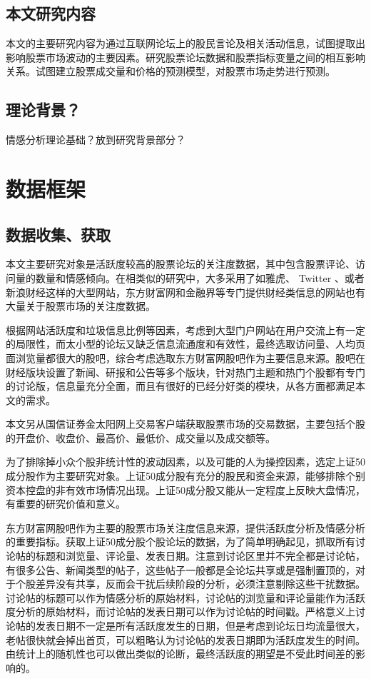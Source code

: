\section{本文研究内容}

本文的主要研究内容为通过互联网论坛上的股民言论及相关活动信息，试图提取出影响股票市场波动的主要因素。研究股票论坛数据和股票指标变量之间的相互影响关系。试图建立股票成交量和价格的预测模型，对股票市场走势进行预测。

\section{理论背景？}

情感分析理论基础？放到研究背景部分？

\chapter{数据框架}

\section{数据收集、获取}

本文主要研究对象是活跃度较高的股票论坛的关注度数据，其中包含股票评论、访问量的数量和情感倾向。在相类似的研究中，大多采用了如雅虎、 Twitter 、或者新浪财经这样的大型网站，东方财富网和金融界等专门提供财经类信息的网站也有大量关于股票市场的关注度数据。

根据网站活跃度和垃圾信息比例等因素，考虑到大型门户网站在用户交流上有一定的局限性，而太小型的论坛又缺乏信息流通度和有效性，最终选取访问量、人均页面浏览量都很大的股吧，综合考虑选取东方财富网股吧作为主要信息来源。股吧在财经版块设置了新闻、研报和公告等多个版块，针对热门主题和热门个股都有专门的讨论版，信息量充分全面，而且有很好的已经分好类的模块，从各方面都满足本文的需求。

本文另从国信证券金太阳网上交易客户端获取股票市场的交易数据，主要包括个股的开盘价、收盘价、最高价、最低价、成交量以及成交额等。

为了排除掉小众个股非统计性的波动因素，以及可能的人为操控因素，选定上证50成分股作为主要研究对象。上证50成分股有充分的股民和资金来源，能够排除个别资本控盘的非有效市场情况出现。上证50成分股又能从一定程度上反映大盘情况，有重要的研究价值和意义。

东方财富网股吧作为主要的股票市场关注度信息来源，提供活跃度分析及情感分析的重要指标。获取上证50成分股个股论坛的数据，为了简单明确起见，抓取所有讨论帖的标题和浏览量、评论量、发表日期。注意到讨论区里并不完全都是讨论帖，有很多公告、新闻类型的帖子，这些帖子一般都是全论坛共享或是强制置顶的，对于个股差异没有共享，反而会干扰后续阶段的分析，必须注意剔除这些干扰数据。讨论帖的标题可以作为情感分析的原始材料，讨论帖的浏览量和评论量能作为活跃度分析的原始材料，而讨论帖的发表日期可以作为讨论帖的时间戳。严格意义上讨论帖的发表日期不一定是所有活跃度发生的日期，但是考虑到论坛日均流量很大，老帖很快就会掉出首页，可以粗略认为讨论帖的发表日期即为活跃度发生的时间。由统计上的随机性也可以做出类似的论断，最终活跃度的期望是不受此时间差的影响的。

